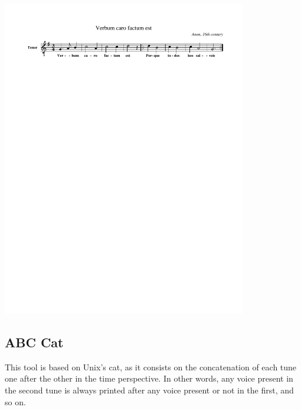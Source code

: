 \documentclass[a4paper,UKenglish]{oasics}
\newcommand{\abc}{\textsc{abc}}
\begin{document}




\vspace{-1.30cm}
\begin{center}
  \includegraphics[width=0.8\textwidth, clip=true, trim = 15mm 231mm 0mm 0mm]{img/103.pdf} 
\end{center}



\subsection{ABC Cat}

This tool is based on Unix's cat, as it consists on the concatenation of each tune one after the
other in the time perspective. In other words, any voice present in the second tune is always
printed after any voice present or not in the first, and so on.
\end{document}
